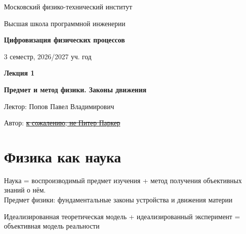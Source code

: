 \documentclass[11pt]{article}
\newcommand{\lectureNumber}{1}
\newcommand{\lectureTitle}{Предмет и метод физики. Законы движения}
\newcommand{\courseName}{Цифровизация физических процессов}
\newcommand{\semester}{3 семестр, 2026/2027 уч. год}
\begin{document}
\begin{titlepage}
    \centering
    
    {\large Московский физико-технический институт \par}
    {\large Высшая школа программной инженерии \par}
    \vspace{2cm}

    {\Large \textbf{\courseName} \par}
    {\large \semester \par}
    
    \vspace*{\fill}

    {\Huge \textbf{Лекция \lectureNumber} \par}
    {\Huge \textbf{\lectureTitle} \par}
    
    \vspace*{\fill}
    
    {\large Лектор: Попов Павел Владимирович \par}
    {\large Автор: \href{https://t.me/mallina_olga }{\sout{к сожалению, не Питер Паркер}} \par}

\end{titlepage}


\section{Физика как наука}
\begin{definition}
    Наука = воспроизводимый предмет изучения + метод получения объективных знаний о нём.\\
    Предмет физики: фундаментальные законы устройства и движения материи
\end{definition}

\begin{definition}
    Идеализированная теоретическая модель + идеализированный эксперимент = объективная модель реальности
\end{definition}
\end{document}
